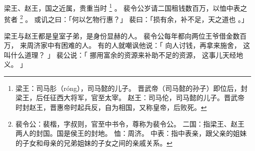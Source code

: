 
\switchcolumn*[\section{}]

梁王、赵王，国之近属，贵重当时%
\footnote{%
    梁王：司马肜（róng），司马懿的儿子。
          晋武帝（司马懿的孙子）即位后，封梁王，后任征西大将军，官至太宰。
    赵王：司马伦，司马懿的儿子。晋武帝时封赵王，晋惠帝时起兵反，自为相国，又称皇帝，后败死。
}%
。
裴令公岁请二国租钱数百万，以恤中表之贫者%
\footnote{%
    裴令公：裴楷，字叔则，官至中书令，尊称为裴令公。
    二国：指梁王、赵王两人的封国。国是侯王的封地。
    恤：周济。
    中表：指中表亲，跟父亲的姐妹的子女和母亲的兄弟姐妹的子女之间的亲戚关系。
}%
。
或讥之曰：「何以乞物行惠？」
裴曰：「损有余，补不足，天之道也 。」

\switchcolumn

梁王与赵王都是皇室子弟，是身份显赫的人。
裴令公每年都向两位王爷借金数百万，
来周济家中有困难的人。
有的人就嘲讽他说：「
    向人讨钱，再拿来施舍，
    这叫什么道理？
」
裴公说：「
    挪用富余的资源来补助不足的资源，
    这事儿天经地义。
」


